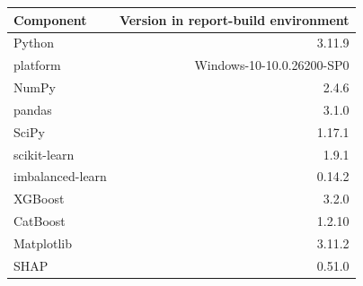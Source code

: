 \begin{tabular}{lr}
\toprule
Component & Version in report-build environment \\
\midrule
Python & 3.11.9 \\
platform & Windows-10-10.0.26200-SP0 \\
NumPy & 2.4.6 \\
pandas & 3.1.0 \\
SciPy & 1.17.1 \\
scikit-learn & 1.9.1 \\
imbalanced-learn & 0.14.2 \\
XGBoost & 3.2.0 \\
CatBoost & 1.2.10 \\
Matplotlib & 3.11.2 \\
SHAP & 0.51.0 \\
\bottomrule
\end{tabular}
